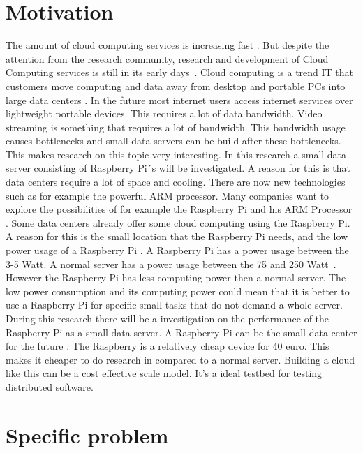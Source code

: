 \documentclass{sig-alternate-br}
\begin{document}
\section{Motivation}
The amount of cloud computing services is increasing fast \cite{armbrust:2009}. But despite the attention from the research community, research and development of Cloud Computing services is still in its early days~\cite{tso:2013}. \newline
Cloud computing is a trend IT that customers move computing and data away from desktop and portable PCs into large data centers \cite{dikaiakos:2009}. In the future most internet users access internet services over lightweight portable devices. This requires a lot of data bandwidth. Video streaming is something that requires a lot of bandwidth. This bandwidth usage causes bottlenecks and small data servers can be build after these bottlenecks. This makes research on this topic very interesting.  \newline
In this research a small data server consisting of Raspberry Pi´s will be investigated. A reason for this is that data centers require a lot of space and cooling. There are now new technologies such as for example the powerful ARM processor. Many companies want to explore the possibilities of for example the Raspberry Pi and his ARM Processor \cite{Pcextreme}. Some data centers already offer some cloud computing using the Raspberry Pi. A reason for this is the small location that the Raspberry Pi needs, and the low power usage of a Raspberry Pi \cite{hosting,Pcextreme}. A Raspberry Pi has a power usage between the 3-5 Watt. A normal server has a power usage between the 75 and 250 Watt~\cite{Powerusage,beloglazov2012energy}. However the Raspberry Pi has less computing power then a normal server. The low power consumption and its computing power could mean that it is better to use a Raspberry Pi for specific small tasks that do not demand a whole server. During this research there will be a investigation on the performance of the Raspberry Pi as a small data server. \newline
A Raspberry Pi can be the small data center for the future \cite{tso:2013}. The Raspberry is a relatively cheap device for 40 euro. This makes it cheaper to do research in compared to a normal server.  Building a cloud like this can be a cost effective scale model\cite{tso:2013}. It's a ideal testbed for testing distributed software. 


\section{Specific problem}
\end{document}
